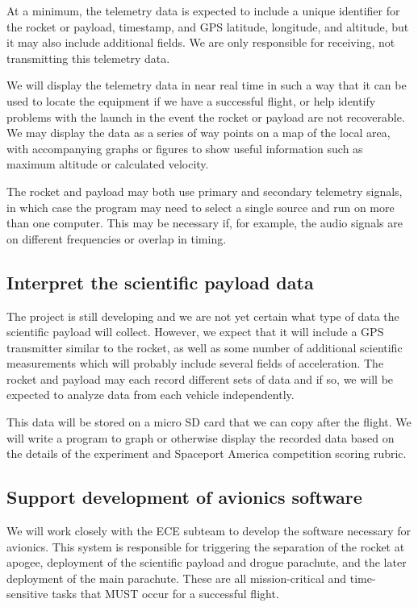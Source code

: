 \documentclass[onecolumn, draftclsnofoot,10pt, compsoc]{IEEEtran}
\begin{document}
At a minimum, the telemetry data is expected to include a unique identifier for the rocket or payload, timestamp, and GPS latitude, longitude, and altitude, but it may also include additional fields.  We are only responsible for receiving, not transmitting this telemetry data.

We will display the telemetry data in near real time in such a way that it can be used to locate the equipment if we have a successful flight, or help identify problems with the launch in the event the rocket or payload are not recoverable.  We may display the data as a series of way points on a map of the local area, with accompanying graphs or figures to show useful information such as maximum altitude or calculated velocity.

The rocket and payload may both use primary and secondary telemetry signals, in which case the program may need to select a single source and run on more than one computer.  This may be necessary if, for example, the audio signals are on different frequencies or overlap in timing.

\subsection{Interpret the scientific payload data}
The project is still developing and we are not yet certain what type of data the scientific payload will collect.  However, we expect that it will include a GPS transmitter similar to the rocket, as well as some number of additional scientific measurements which will probably include several fields of acceleration.   The rocket and payload may each record different sets of data and if so, we will be expected to analyze data from each vehicle independently.

This data will be stored on a micro SD card that we can copy after the flight.  We will write a program to graph or otherwise display the recorded data based on the details of the experiment and Spaceport America competition scoring rubric.

\subsection{Support development of avionics software}
We will work closely with the ECE subteam to develop the software necessary for avionics.  This system is responsible for triggering the separation of the rocket at apogee, deployment of the scientific payload and drogue parachute, and the later deployment of the main parachute.  These are all mission-critical and time-sensitive tasks that MUST occur for a successful flight.
\end{document}

